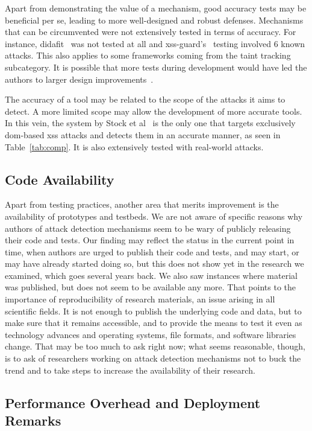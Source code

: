 \documentclass[conference]{IEEEtran}
\begin{document}
Apart from demonstrating the value of a mechanism, good accuracy tests
may be beneficial per se, leading to more well-designed and robust
defenses. Mechanisms that can be circumvented were not extensively
tested in terms of accuracy. For instance, {\sc didafit}~\cite{LLW02}
was not tested at all and {\sc xss-guard}'s~\cite{BV08}
testing involved 6 known attacks.
This also applies to some frameworks coming from the taint tracking
subcategory. It is possible that more tests during development would
have led the authors to larger design improvements~\cite{Van14}.

The accuracy of a tool may be related to the scope of the attacks it
aims to detect. A more limited scope may allow the development of more
accurate tools. In this vein, the system by Stock et al~\cite{SLMS14}
is the only one that targets exclusively {\sc dom}-based {\sc xss}
attacks and detects them in an accurate manner, as seen in
Table~\ref{tab:comp}. It is also extensively tested with real-world
attacks.

\subsection{Code Availability}

Apart from testing practices, another area that merits improvement is
the availability of prototypes and testbeds. We are not aware of
specific reasons why authors of attack detection mechanisms seem to be
wary of publicly releasing their code and tests. Our finding may reflect
the status in the current point in time, when authors are urged to
publish their code and tests, and may start, or may have already
started doing so, but this does not show yet in the research we
examined, which goes several years back. We also saw instances where
material was published, but does not seem to be available any more.
That points to the importance of reproducibility of research materials, 
an issue arising in all scientific fields. It is not enough to
publish the underlying code and data, but to make sure that it remains
accessible, and to provide the means to test it even as technology
advances and operating systems, file formats, and software libraries
change. That may be too much to ask right now; what seems reasonable,
though, is to ask of researchers working on attack detection mechanisms not to
buck the trend and to take steps to increase the availability of their
research.

\subsection{Performance Overhead and Deployment Remarks}
\end{document}
